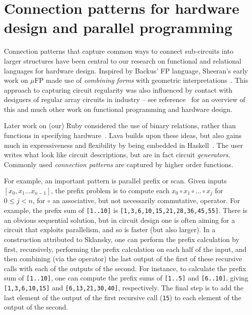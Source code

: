 \section{Connection patterns for hardware design and parallel programming}\label{sec:combinators}

Connection patterns that capture common ways to connect sub-circuits into larger structures have been central to our research on functional and relational languages for hardware design.
Inspired by Backus' FP language, Sheeran's early work on $\mu$FP made use of
{\em combining forms} with geometric interpretations~\cite{SheeranLFP84}. This approach
to capturing circuit regularity was also influenced by contact
with designers of regular array circuits in industry -- see reference~\cite{SheeranJUCS} for an overview of this and much other work on functional programming and hardware design.

Later work on (our) Ruby considered the use of binary relations, rather than functions in specifying hardware~\cite{LyngbyRuby}. Lava builds upon these ideas, but also gains much in expressiveness and flexibility by being embedded in Haskell~\cite{lavaICFP,ClaessenThesis}.
The user writes what look like circuit descriptions, but are in fact circuit {\em generators}. Commonly used {\em connection patterns} are captured by higher order functions.

For example, an important pattern is parallel prefix or scan. Given inputs $[x_0, x_1 \ldots x_{n-1}]$, the prefix problem is to compute each $x_0 \circ x_1 \circ \ldots \circ x_j$ for $0 \leq j < n$, for $\circ$ an associative, but not necessarily commutative, operator. For example, the prefix sum of {\tt [1..10]} is {\tt [1,3,6,10,15,21,28,36,45,55]}. There is an obvious sequential solution, but in circuit design one is often aiming for a circuit that exploits parallelism, and so is faster (but also larger). In a construction attributed to Sklansky, one can perform the prefix
calculation by first, recursively, performing the prefix calculation on 
each half of the input, and then combining (via the operator) the last output of the first of these
recursive calls with each of the outputs of the second.
For instance, to calculate the prefix sum of {\tt [1..10]}, one can compute the prefix
sums of {\tt [1..5]} and {\tt [6..10]}, giving {\tt [1,3,6,10,15]}
and {\tt [6,13,21,30,40]}, respectively. 
The final step is to add the last element of the output of the first recursive call ({\tt 15}) to each element of
the output of the second.

